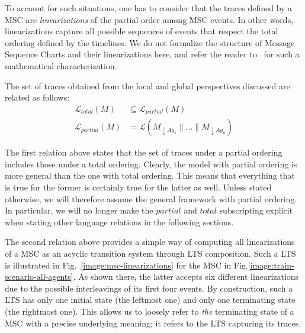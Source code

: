 To account for such situations, one has to consider that the traces defined by a MSC are \emph{linearizations} of the partial order among MSC events. In other words, linearizations capture all possible sequences of events that respect the total ordering defined by the timelines. We do not formalize the structure of Message Sequence Charts and their linearizations here, and refer the reader to~\cite{Uchitel:2003} for such a mathematical characterization. 

The set of traces obtained from the local and global perspectives discussed are related as follows:
\begin{align}
\mathcal{L}_{total}(M) & \subseteq \mathcal{L}_{partial}(M) \\
\mathcal{L}_{partial}(M) &= \mathcal{L}(M_{\downarrow Ag_1} \parallel \ldots \parallel M_{\downarrow Ag_n})
\label{equation:msc-composition}
\end{align}

The first relation above states that the set of traces under a partial ordering includes those under a total ordering. Clearly, the model with partial ordering is more general than the one with total ordering. This means that everything that is true for the former is certainly true for the latter as well. Unless stated otherwise, we will therefore assume the general framework with partial ordering. In particular, we will no longer make the $partial$ and $total$ subscripting explicit when stating other language relations in the following sections.

The second relation above provides a simple way of computing all linearizations of a MSC as an acyclic transition system through LTS composition. Such a LTS is illustrated in Fig.~\ref{image:msc-linearizations} for the MSC in Fig.\ref{image:train-scenario-all-agents}. As shown there, the latter accepts six different linearizations due to the possible interleavings of its first four events. By construction, such a LTS has only one initial state (the leftmost one) and only one terminating state (the rightmost one). This allows us to loosely refer to \emph{the} terminating state of a MSC with a precise underlying meaning; it refers to the LTS capturing its traces.


